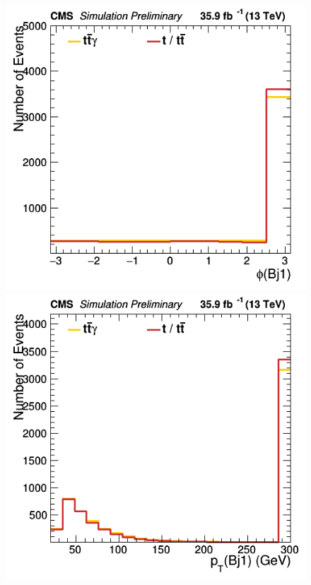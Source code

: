 \documentclass[11pt]{scrartcl}
\begin{document}
	\begin{figure}[H]
	\centering
	\begin{minipage}{.5\textwidth}
	  \centering
	  \includegraphics[width=0.7\linewidth]{figures/Notused/Bj1_phi.png}
	\end{minipage}%
	\begin{minipage}{.5\textwidth}
	  \centering
	  \includegraphics[width=0.7\linewidth]{figures/Notused/Bj1_pt.png}
	\end{minipage}
	\end{figure}
	
\end{document}
